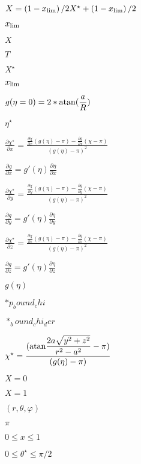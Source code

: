 \documentclass{article}
\begin{document}
$ X = \left(1 - x_{\rm lim}\right)/2 X^\star + \left(1 - x_{\rm lim}\right)/2 $
\pagebreak

$ x_{\rm lim}$
\pagebreak

$ X$
\pagebreak

$ T$
\pagebreak

$ X^\star $
\pagebreak

$ x_{\rm lim} $
\pagebreak

$ g (\eta=0) = 2*{\rm atan}(\displaystyle\frac{a}{R}) $
\pagebreak

$ \eta^\star $
\pagebreak

$ \displaystyle\frac{\partial \chi^\star}{\partial x } = \displaystyle\frac{\displaystyle\frac{\partial \chi}{\partial x}(g(\eta) - \pi) - \displaystyle\frac{\partial g}{\partial x}(\chi - \pi)}{(g(\eta)-\pi)^2} $
\pagebreak

$ \displaystyle\frac{\partial g}{\partial x} = g'(\eta) \displaystyle\frac{\partial \eta}{\partial x}$
\pagebreak

$ \displaystyle\frac{\partial \chi^\star}{\partial y} = \displaystyle\frac{\displaystyle\frac{\partial \chi}{\partial y}(g(\eta) - \pi) - \displaystyle\frac{\partial g}{\partial y}(\chi - \pi)}{(g(\eta)-\pi)^2} $
\pagebreak

$ \displaystyle\frac{\partial g}{\partial y} = g'(\eta) \displaystyle\frac{\partial \eta}{\partial y}$
\pagebreak

$ \displaystyle\frac{\partial \chi^\star}{\partial z} = \displaystyle\frac{\displaystyle\frac{\partial \chi}{\partial z}(g(\eta) - \pi) - \displaystyle\frac{\partial g}{\partial z}(\chi - \pi)}{(g(\eta)-\pi)^2} $
\pagebreak

$ \displaystyle\frac{\partial g}{\partial z} = g'(\eta) \displaystyle\frac{\partial \eta}{\partial z}$
\pagebreak

$ g(\eta) $
\pagebreak

$ *p_bound_chi $
\pagebreak

$ *_bound_chi_der $
\pagebreak

$ \chi^\star = \displaystyle\frac{({\rm atan} \displaystyle\frac{2a\sqrt{y^2+z^2}}{r^2-a^2}-\pi)} {(g(\eta) - \pi)} $
\pagebreak

$ X=0$
\pagebreak

$ X=1 $
\pagebreak

$(r,\theta, \varphi)$
\pagebreak

$\pi$
\pagebreak

$ 0 \leq x \leq 1 $
\pagebreak

$ 0 \leq \theta^\star \leq \pi/2 $
\pagebreak
\end{document}
